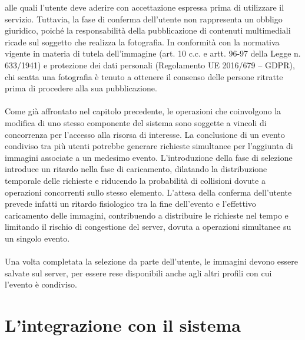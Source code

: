 alle quali l’utente deve aderire con accettazione espressa prima di utilizzare il servizio. 
Tuttavia, la fase di conferma dell’utente non rappresenta un obbligo giuridico, 
poiché la responsabilità della pubblicazione di contenuti multimediali 
ricade sul soggetto che realizza la fotografia. 
In conformità con la normativa vigente in materia di tutela dell’immagine 
(art. 10 c.c. e artt. 96-97 della Legge n. 633/1941) e protezione dei dati personali (Regolamento UE 2016/679 – GDPR), 
chi scatta una fotografia è tenuto a ottenere il consenso delle persone ritratte 
prima di procedere alla sua pubblicazione.\\
\\
Come già affrontato nel capitolo precedente, 
le operazioni che coinvolgono la modifica di uno stesso componente del sistema 
sono soggette a vincoli di concorrenza per l’accesso alla risorsa di interesse. 
La conclusione di un evento condiviso tra più utenti 
potrebbe generare richieste simultanee per l’aggiunta di immagini associate a un medesimo evento. 
L’introduzione della fase di selezione introduce un ritardo nella fase di caricamento, 
dilatando la distribuzione temporale delle richieste e riducendo la probabilità di collisioni 
dovute a operazioni concorrenti sullo stesso elemento.
L’attesa della conferma dell’utente prevede infatti un ritardo fisiologico 
tra la fine dell’evento e l’effettivo caricamento delle immagini, 
contribuendo a distribuire le richieste nel tempo e 
limitando il rischio di congestione del server, 
dovuta a operazioni simultanee su un singolo evento.\\
\\
Una volta completata la selezione da parte dell’utente, 
le immagini devono essere salvate sul server, 
per essere rese disponibili anche agli altri profili con cui l'evento è condiviso.
\clearpage
\section{L'integrazione con il sistema}

